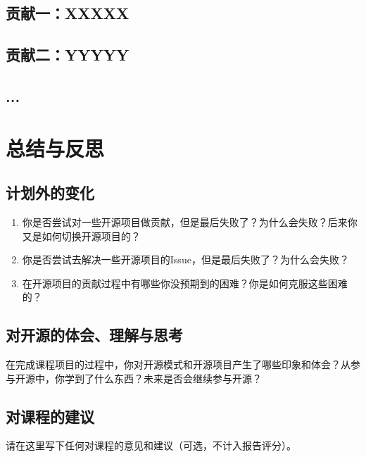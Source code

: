 \documentclass[lang=cn,11pt,a4paper,cite=authoryear]{elegantpaper}
\begin{document}
\subsection{贡献一：XXXXX}

\subsection{贡献二：YYYYY}

\subsection{...}

\section{总结与反思}

\subsection{计划外的变化}

\begin{tcolorbox}[title=\textbf{请在这一节包含如下内容（如果有）：},colback=yellow!10!white]
\begin{enumerate}
    \item 你是否尝试对一些开源项目做贡献，但是最后失败了？为什么会失败？后来你又是如何切换开源项目的？
    \item 你是否尝试去解决一些开源项目的Issue，但是最后失败了？为什么会失败？
    \item 在开源项目的贡献过程中有哪些你没预期到的困难？你是如何克服这些困难的？
\end{enumerate}
\end{tcolorbox}

\subsection{对开源的体会、理解与思考}

\begin{tcolorbox}[title=\textbf{请在这一节中写下任何你想要表达的内容，下述问题仅供参考：},colback=yellow!10!white]
在完成课程项目的过程中，你对开源模式和开源项目产生了哪些印象和体会？从参与开源中，你学到了什么东西？未来是否会继续参与开源？
\end{tcolorbox}

\subsection{对课程的建议}

\begin{tcolorbox}[colback=yellow!10!white]
请在这里写下任何对课程的意见和建议（可选，不计入报告评分）。
\end{tcolorbox}


\nocite{*}

\end{document}
